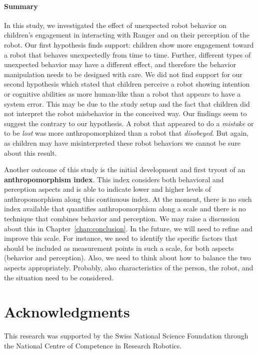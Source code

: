 \documentclass{sig-alternate}
\begin{document}
\paragraph{Summary}

In this study, we investigated the effect of unexpected robot behavior on
children's engagement in interacting with Ranger and on their perception of the
robot.  Our first hypothesis finds support: children show more engagement toward
a robot that behaves unexpectedly from time to time. Further, different types of
unexpected behavior may have a different effect, and therefore the behavior
manipulation needs to be designed with care.
We did not find support for our second hypothesis which stated that children
perceive a robot showing intention or cognitive abilities as more human-like
than a robot that appears to have a system error. This may be due to the study
setup and the fact that children did not interpret the robot misbehavior in the
conceived way. Our findings seem to suggest the contrary to our hypothesis. A
robot that appeared to do a \textit{mistake} or to be \textit{lost} was more
anthropomorphized than a robot that \textit{disobeyed}. But again, as children
may have misinterpreted these robot behaviors we cannot be sure about this
result.

Another outcome of this study is the initial development and first tryout of an
\textbf{anthropomorphism index}. This index considers both behavioral and
perception aspects and is able to indicate lower and higher levels of
anthropomorphism along this continuous index. At the moment, there is no such
index available that quantifies anthropomorphism along a scale and there is no
technique that combines behavior and perception. We may raise a discussion about
this in Chapter~\ref{chap:conclusion}.  In the future, we will need to refine
and improve this scale. For instance, we need to identify the specific factors
that should be included as measurement points in such a scale, for both aspects
(behavior and perception). Also, we need to think about how to balance the two
aspects appropriately. Probably, also characteristics of the person, the robot,
and the situation need to be considered. 

\nocite{johnson_detecting_2003}

\section*{Acknowledgments}

This research was supported by the Swiss National Science Foundation through the
National Centre of Competence in Research Robotics.




\balancecolumns
\end{document}
